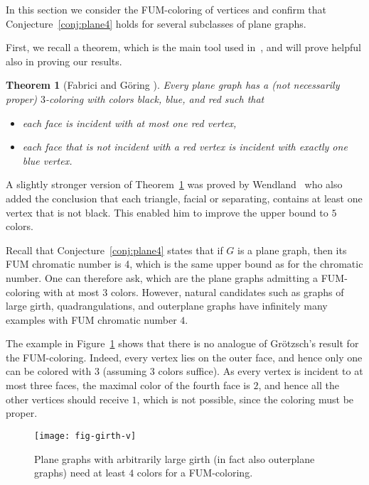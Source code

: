\documentclass[a4paper,12pt]{article}
\newtheorem{theorem}{Theorem}
\begin{document}
In this section we consider the FUM-coloring of vertices and confirm that Conjecture~\ref{conj:plane4} holds for
several subclasses of plane graphs.

First, we recall a theorem, which is the main tool used in~\cite{FabGor16}, and will prove helpful also in proving our results.
\begin{theorem}[Fabrici and G\"{o}ring \cite{FabGor16}]
	\label{thm:aux}
	Every plane graph has a (not necessarily proper) $3$-coloring with colors black, blue, and red such that
	\begin{itemize}
		\item[(1)] each face is incident with at most one red vertex,
		\item[(2)] each face that is not incident with a red vertex is incident with exactly one blue vertex.
	\end{itemize}
\end{theorem}
A slightly stronger version of Theorem~\ref{thm:aux} was proved by Wendland~\cite{Wen16} who
also added the conclusion that each triangle, facial or separating, contains at least one vertex that is not black.
This enabled him to improve the upper bound to $5$ colors.

Recall that Conjecture~\ref{conj:plane4} states that if $G$ is a plane graph, then its FUM chromatic number is 4,
which is the same upper bound as for the chromatic number.
One can therefore ask, which are the plane graphs admitting a FUM-coloring with at most $3$ colors.
However, natural candidates such as graphs of large girth, quadrangulations, and outerplane graphs
have infinitely many examples with FUM chromatic number $4$.

The example in Figure~\ref{fig:girth-v} shows that there is no analogue of Gr\"{o}tzsch's result for the FUM-coloring.
Indeed, every vertex lies on the outer face, and hence only one can be colored with $3$ (assuming $3$ colors suffice). As every vertex is incident to at
most three faces, the maximal color of the fourth face is $2$, and hence all the other vertices should receive $1$,
which is not possible, since the coloring must be proper.
\begin{figure}[htp!]
	\begin{center}
		\texttt{[image: fig-girth-v]}
	\end{center}
	\caption{Plane graphs with arbitrarily large girth (in fact also outerplane graphs) need at least $4$ colors for a FUM-coloring.}
	\label{fig:girth-v}
\end{figure}
\end{document}
